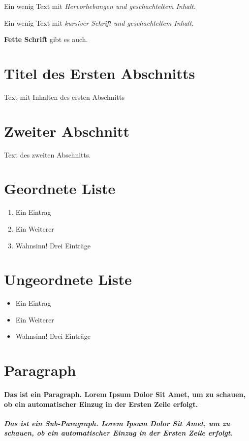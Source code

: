 \documentclass{article}
\begin{document}
Ein wenig Text mit \emph{Hervorhebungen und \emph{geschachteltem} Inhalt.}

Ein wenig Text mit \textit{kursiver Schrift und \textit{geschachteltem} Inhalt.}

\textbf{Fette Schrift} gibt es auch.


\section{Titel des Ersten Abschnitts}

Text mit Inhalten des ersten Abschnitts

\section{Zweiter Abschnitt}

Text des zweiten Abschnitts.


\section{Geordnete Liste}

\begin{enumerate}
    \item Ein Eintrag
    \item Ein Weiterer
    \item Wahnsinn! Drei Einträge
\end{enumerate}

\section{Ungeordnete Liste}

\begin{itemize}
    \item Ein Eintrag
    \item Ein Weiterer
    \item Wahnsinn! Drei Einträge
\end{itemize}

\section{Paragraph}

\paragraph{Das ist ein Paragraph. Lorem Ipsum Dolor Sit Amet, um zu schauen, ob ein automatischer Einzug in der Ersten Zeile erfolgt.}

\subparagraph{Das ist ein Sub-Paragraph. Lorem Ipsum Dolor Sit Amet, um zu schauen, ob ein automatischer Einzug in der Ersten Zeile erfolgt.}
\end{document}
